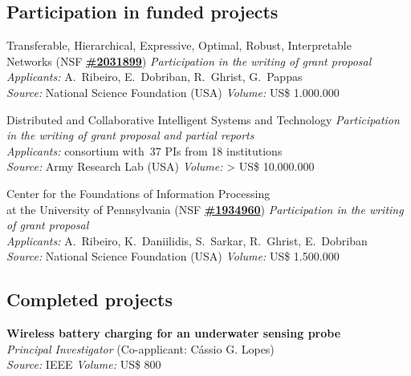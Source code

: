 \documentclass{cvlfoc}
\begin{document}
{\subsection*{Participation in funded projects}

\begin{entrydate}
		{Transferable, Hierarchical, Expressive, Optimal, Robust,
			Interpretable\\Networks
		{\normalfont (NSF \href{https://www.nsf.gov/awardsearch/showAward?AWD_ID=2031899}{\textbf{\#2031899}})}}
		{}
		{\emph{Participation in the writing of grant proposal}\\
		\emph{Applicants:} A.\ Ribeiro, E.\ Dobriban, R.\ Ghrist, G.\ Pappas\\
		\emph{Source:} National Science Foundation (USA) \hfill
			\emph{Volume:} US\$ 1.000.000}

		{Distributed and Collaborative Intelligent Systems and Technology}
		{}
		{\emph{Participation in the writing of grant proposal and partial reports}\\
		\emph{Applicants:} consortium with~37 PIs from 18 institutions\\
		\emph{Source:} Army Research Lab (USA) \hfill
			\emph{Volume:} > US\$ 10.000.000}

		{Center for the Foundations of Information Processing\\
			at the University of Pennsylvania
		{\normalfont (NSF \href{https://www.nsf.gov/awardsearch/showAward?AWD_ID=1934960}{\textbf{\#1934960}})}}
		{}
		{\emph{Participation in the writing of grant proposal}\\
		\emph{Applicants:} A.\ Ribeiro, K.\ Daniilidis, S.\ Sarkar,
			R.\ Ghrist, E.\ Dobriban\\
		\emph{Source:} National Science Foundation (USA) \hfill
			\emph{Volume:} US\$ 1.500.000}
\end{entrydate}



\subsection*{Completed projects}

\begin{entrydate}
		{\textbf{Wireless battery charging for an underwater sensing probe}\\
		\emph{Principal Investigator} (Co-applicant: C\'{a}ssio G. Lopes)\\
		\emph{Source:} IEEE \hfill \emph{Volume:} US\$ 800}
\end{entrydate}
}{}
\end{document}
